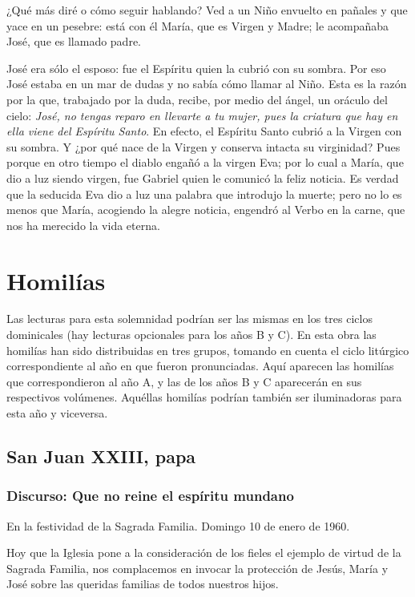 \begin{body}
\begin{body}
¿Qué más diré o cómo seguir hablando? Ved a un Niño envuelto en pañales y que yace en un pesebre: está con él María, que es Virgen y Madre; le acompañaba José, que es llamado padre.

José era sólo el esposo: fue el Espíritu quien la cubrió con su sombra. Por eso José estaba en un mar de dudas y no sabía cómo llamar al Niño. Esta es la razón por la que, trabajado por la duda, recibe, por medio del ángel, un oráculo del cielo: \emph{José, no tengas reparo en llevarte a tu mujer, pues la criatura que hay en ella viene del Espíritu Santo}. En efecto, el Espíritu Santo cubrió a la Virgen con su sombra. Y ¿por qué nace de la Virgen y conserva intacta su virginidad? Pues porque en otro tiempo el diablo engañó a la virgen Eva; por lo cual a María, que dio a luz siendo virgen, fue Gabriel quien le comunicó la feliz noticia. Es verdad que la seducida Eva dio a luz una palabra que introdujo la muerte; pero no lo es menos que María, acogiendo la alegre noticia, engendró al Verbo en la carne, que nos ha merecido la vida eterna.

\section{Homilías}

Las lecturas para esta solemnidad podrían ser las mismas en los tres ciclos dominicales (hay lecturas opcionales para los años B y C). En esta obra las homilías han sido distribuidas en tres grupos, tomando en cuenta el ciclo litúrgico correspondiente al año en que fueron pronunciadas. Aquí aparecen las homilías que correspondieron al año A, y las de los años B y C aparecerán en sus respectivos volúmenes. Aquéllas homilías podrían también ser iluminadoras para esta año y viceversa.

\subsection{San Juan XXIII, papa}

\subsubsection{Discurso: Que no reine el espíritu mundano}

En la festividad de la Sagrada Familia. Domingo 10 de enero de 1960.

Hoy que la Iglesia pone a la consideración de los fieles el ejemplo de virtud de la Sagrada Familia, nos complacemos en invocar la protección de Jesús, María y José sobre las queridas familias de todos nuestros hijos.


\end{body}
\end{body}
